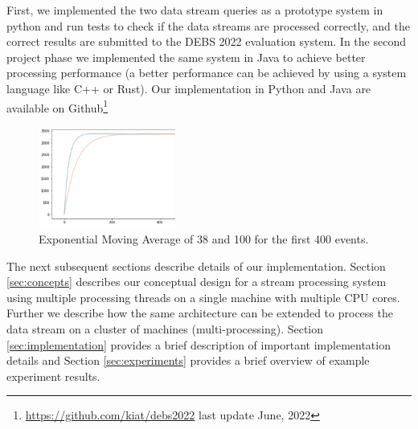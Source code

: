 First, we implemented the two data stream queries as a prototype system in python and run tests to check if the data streams are processed correctly, and the correct
results are submitted to the DEBS 2022 evaluation system. In the second project phase we implemented the same system in Java to achieve better processing 
performance (a better performance can be achieved by using a system language like C++ or Rust).  
Our implementation in Python and Java are available on Github\footnote{\url{https://github.com/kiat/debs2022} last update June, 2022}



\begin{figure}[!ht]
    \begin{center}
        \includegraphics[width=0.4\textwidth]{./images/query2_example_200.png}
        \caption{Exponential Moving Average of 38 and 100 for the first 400 events.}
        \label{fig:EMA200}
    \end{center}
\end{figure}


The next subsequent sections describe details of our implementation. Section \ref{sec:concepts} describes our conceptual design for
a stream processing system using multiple processing threads on a single machine with multiple CPU cores. Further we describe how the same
architecture can be extended to process the data stream on a cluster of machines (multi-processing).  Section \ref{sec:implementation} provides
a brief description of important implementation details and Section \ref{sec:experiments} provides a brief overview of example
experiment results.
